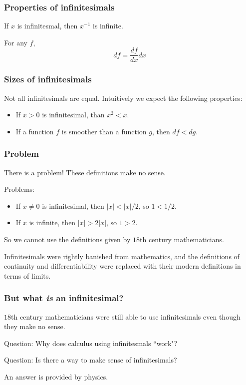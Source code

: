 \documentclass{beamer}
\begin{document}
\begin{frame}
\frametitle{Properties of infinitesimals}
\begin{lemma}
    If $x$ is infinitesmal, then $x^{-1}$ is infinite.
\end{lemma} 
\begin{lemma}
    For any $f$,
    \begin{equation*}
        df = \frac{df}{dx}dx
    \end{equation*}
\end{lemma}
\end{frame}

\begin{frame}
\frametitle{Sizes of infinitesimals}
Not all infinitesimals are equal.
Intuitively we expect the following properties:
\begin{itemize}
\item{} If $x > 0$ is infinitesimal, than $x^2 < x$.
\item{} If a function $f$ is smoother than a function $g$, then $df < dg$.
\end{itemize}
\end{frame}

\begin{frame}
\frametitle{Problem}
There is a problem! These definitions make no sense.
\begin{block}
{Problems:}
\begin{itemize}
    \item{} If $x \neq 0$ is infinitesimal, then $|x| < |x|/2$, so $1 < 1/2$.

    \item{} If $x$ is infinite, then $|x| > 2|x|$, so $1 > 2$.
\end{itemize}
\end{block}

So we cannot use the definitions given by $18$th century mathematicians.
\end{frame}
\begin{frame}
    Infinitesimals were rightly banished from mathematics, and the definitions
    of continuity and differentiability were replaced with their modern 
    definitions in terms of limits.
\end{frame}

\begin{frame}
\frametitle{But what \emph{is} an infinitesimal?}
$18$th century mathematicians were still able to use infinitesimals
even though they make no sense. 
\begin{block}
    {Question:}
    Why does calculus using infinitesmals ``work"?
\end{block}
\begin{block}
    {Question:}
    Is there a way to make sense of infinitesimals?
\end{block}
An answer is provided by physics.
\end{frame}
\end{document}
